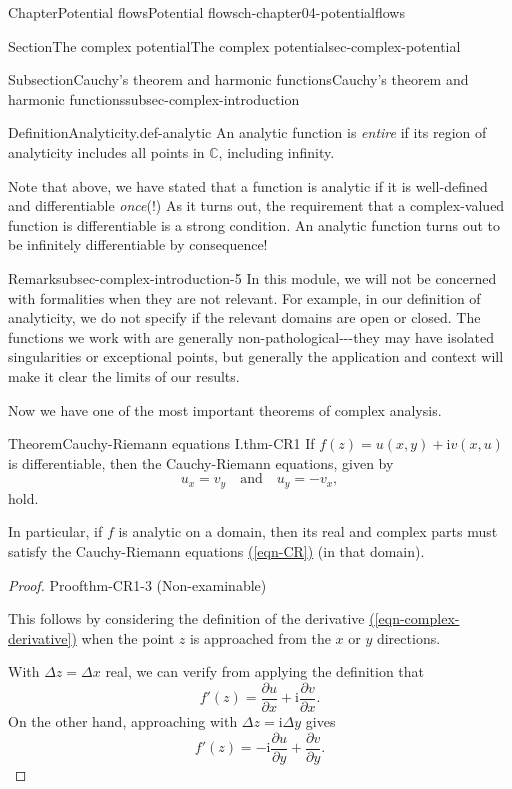 \documentclass[oneside,10pt,]{book}
\newcommand{\xreffont}{\relax}
\numberwithin{equation}{section}
\newcommand{\im}{\mathrm{i}}
\newcommand{\pd}[2]{\frac{\partial#1}{\partial#2}}
\begin{document}
\begin{chapterptx}{Chapter}{Potential flows}{}{Potential flows}{}{}{ch-chapter04-potentialflows}
\begin{sectionptx}{Section}{The complex potential}{}{The complex potential}{}{}{sec-complex-potential}
\begin{subsectionptx}{Subsection}{Cauchy's theorem and harmonic functions}{}{Cauchy's theorem and harmonic functions}{}{}{subsec-complex-introduction}
\begin{definition}{Definition}{Analyticity.}{def-analytic}
An analytic function is \emph{entire} if its region of analyticity includes all points in \(\mathbb{C}\), including infinity.%
\end{definition}
Note that above, we have stated that a function is analytic if it is well-defined and differentiable \emph{once}(!) As it turns out, the requirement that a complex-valued function is differentiable is a strong condition. An analytic function turns out to be infinitely differentiable by consequence!%
\begin{remark}{Remark}{}{subsec-complex-introduction-5}%
In this module, we will not be concerned with formalities when they are not relevant. For example, in our definition of analyticity, we do not specify if the relevant domains are open or closed. The functions we work with are generally non-pathological-{}-{}-they may have isolated singularities or exceptional points, but generally the application and context will make it clear the limits of our results.%
\end{remark}
Now we have one of the most important theorems of complex analysis.%
\begin{theorem}{Theorem}{Cauchy-Riemann equations I.}{}{thm-CR1}%
If \(f(z) = u(x, y) + \im v(x, u)\) is differentiable, then the Cauchy-Riemann equations, given by%
\begin{equation}
u_x = v_y \quad \text{and} \quad u_y = -v_x,\label{eqn-CR}
\end{equation}
hold.%
\par
In particular, if \(f\) is analytic on a domain, then its real and complex parts must satisfy the Cauchy-Riemann equations \hyperref[eqn-CR]{({\xreffont\ref{eqn-CR}})} (in that domain).%
\end{theorem}
\begin{proof}{Proof}{}{thm-CR1-3}
(Non-examinable)%
\par
This follows by considering the definition of the derivative \hyperref[eqn-complex-derivative]{({\xreffont\ref{eqn-complex-derivative}})} when the point \(z\) is approached from the \(x\) or \(y\) directions.%
\par
With \(\Delta z = \Delta x\) real, we can verify from applying the definition that%
\begin{equation*}
f'(z) = \pd{u}{x} + \im \pd{v}{x}.
\end{equation*}
On the other hand, approaching with \(\Delta z = \im \Delta y\) gives%
\begin{equation*}
f'(z) = -\im \pd{u}{y} + \pd{v}{y}. 
\end{equation*}

\end{proof}
\end{subsectionptx}
\end{sectionptx}
\end{chapterptx}
\end{document}
